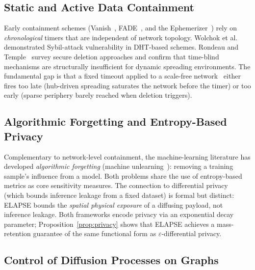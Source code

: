\documentclass[review,12pt]{elsarticle}
\begin{document}
\subsection{Static and Active Data Containment}

Early containment schemes (Vanish~\cite{geambasu2009vanish},
FADE~\cite{tang2010fade}, and the Ephemerizer~\cite{perlman2005ephemerizer})
rely on \emph{chronological} timers that are independent of network
topology.  Wolchok et al.~\cite{wolchok2010defeating} demonstrated Sybil-attack
vulnerability in DHT-based schemes.  Rondeau and Temple~\cite{rondeau2021secure}
survey secure deletion approaches and confirm that time-blind mechanisms are
structurally insufficient for dynamic spreading environments.
The fundamental gap is that a fixed timeout applied to a scale-free
network~\cite{albert2002statistical} either fires too late
(hub-driven spreading saturates the network before the timer) or too
early (sparse periphery barely reached when deletion triggers).

\subsection{Algorithmic Forgetting and Entropy-Based Privacy}

Complementary to network-level containment, the machine-learning literature
has developed \emph{algorithmic forgetting} (machine
unlearning~\cite{bourtoule2021machine,xu2023machine}): removing a training
sample's influence from a model.  Both problems share the use of
entropy-based metrics as core sensitivity measures.  The connection to
differential privacy~\cite{dwork2014algorithmic} (which bounds inference
leakage from a fixed dataset) is formal but distinct: ELAPSE bounds
the \emph{spatial physical exposure} of a diffusing payload, not inference
leakage.  Both frameworks encode privacy via an exponential decay parameter;
Proposition~\ref{prop:privacy} shows that ELAPSE achieves a mass-retention
guarantee of the same functional form as $\varepsilon$-differential privacy.

\subsection{Control of Diffusion Processes on Graphs}
\end{document}
